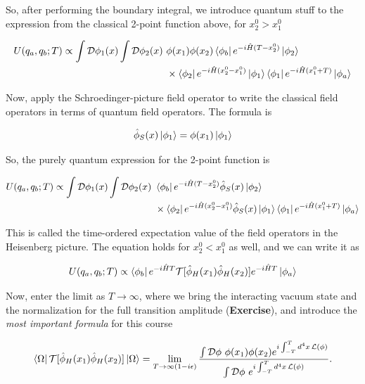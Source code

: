 \noindent So, after performing the boundary integral, we introduce quantum stuff to the expression from the classical 2-point function above, for $x_2^0 > x_1^0$

\begin{align*}
U(q_a, q_b; T) \propto \int \mathcal{D} \phi_1 (x) \int \mathcal{D} \phi_2 (x) \,\, &\phi(x_1) \phi(x_2) \bra{\phi_b} e^{-i \hat{H} (T-x_2^0)} \ket{\phi_2} \\
 &\times \bra{\phi_2} e^{-i \hat{H} (x_2^0 - x_1^0)} \ket{\phi_1} \bra{\phi_1} e^{-i \hat{H} (x_1^0 + T)} \ket{\phi_a}
\end{align*}

\noindent Now, apply the Schroedinger-picture field operator to write the classical field operators in terms of quantum field operators. The formula is

\begin{equation}
\hat{\phi}_S (x) \ket{\phi_1} = \phi (x_1) \ket{\phi_1}
\end{equation}

\noindent So, the purely quantum expression for the 2-point function is

\begin{align*}
U(q_a, q_b; T) \propto\int \mathcal{D} \phi_1 (x) \int \mathcal{D} \phi_2 (x) \,\, &\bra{\phi_b} e^{-i \hat{H} (T-x_2^0)} \hat{\phi}_S (x) \ket{\phi_2} \\
 &\times \bra{\phi_2} e^{-i \hat{H} (x_2^0 - x_1^0)} \hat{\phi}_S (x) \ket{\phi_1} \bra{\phi_1} e^{-i \hat{H} (x_1^0 + T)} \ket{\phi_a}
\end{align*}

\noindent This is called the time-ordered expectation value of the field operators in the Heisenberg picture. The equation holds for $x_2^0 < x_1^0$ as well, and we can write it as

\begin{equation}
U(q_a, q_b; T) \propto \bra{\phi_b} e^{-i \hat{H} T} \mathcal{T}[ \hat{\phi}_H (x_1) \hat{\phi}_H (x_2)] e^{-i \hat{H} T} \ket{\phi_a}
\end{equation}

\noindent Now, enter the limit as $T \rightarrow \infty$, where we bring the interacting vacuum state and the normalization for the full transition amplitude (\textbf{Exercise}), and introduce the \textit{most important formula} for this course

\begin{equation}
\bra{\Omega} \mathcal{T} [ \hat{\phi}_H (x_1) \hat{\phi}_H (x_2) ] \ket{\Omega} = \lim_{T \rightarrow \infty (1-i\epsilon)} \frac{\int \mathcal{D} \phi \,\, \phi (x_1) \phi (x_2) e^{i \int_{-T}^T d^4 x \, \mathcal{L} (\phi)}}{\int \mathcal{D} \phi \,\, e^{i \int_{-T}^T d^4 x \, \mathcal{L} (\phi)}}.
\end{equation}

